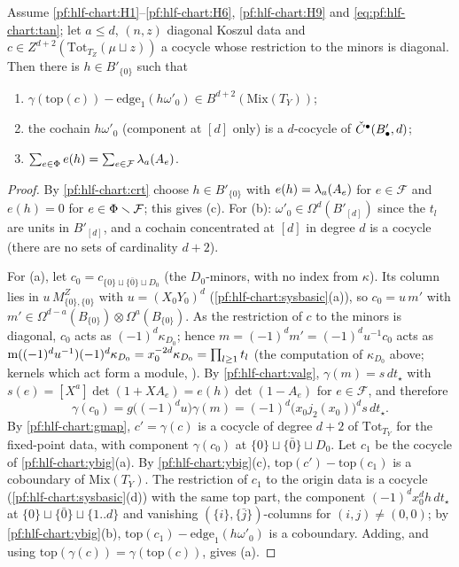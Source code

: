 \begin{lemma}[Localization]\label{pf:hlf-chart:ymain}
Assume \ref{pf:hlf-chart:H1}--\ref{pf:hlf-chart:H6}, \ref{pf:hlf-chart:H9} and \eqref{eq:pf:hlf-chart:tan}; let $a\le d$, $(n,z)$ diagonal Koszul data
and $c\in Z^{d+2}(\mathrm{Tot}_{T_Z}(\mu\sqcup z))$ a cocycle whose restriction to the minors is diagonal. Then there is $h\in B'_{\{0\}}$ such that
\begin{enumerate}[label=\textup{(\alph*)},nosep]
\item $\gamma(\mathrm{top}(c))-\mathrm{edge}_1(h\omega'_0)\in B^{d+2}(\mathrm{Mix}(T_Y))$;
\item the cochain $h\omega'_0$ (component at $[d]$ only) is a $d$-cocycle of $\check{C}^\bullet(B'_\bullet,d)$;
\item $\sum_{e\in\Phi}e(h)=\sum_{e\in\mathcal F}\lambda_a(A_e)$.
\end{enumerate}
\end{lemma}

\begin{proof}
By \cref{pf:hlf-chart:crt} choose $h\in B'_{\{0\}}$ with $e(h)=\lambda_a(A_e)$ for $e\in\mathcal F$ and $e(h)=0$ for $e\in\Phi\smallsetminus\mathcal F$;
this gives (c). For (b): $\omega'_0\in\Omega^d(B'_{[d]})$ since the $t_l$ are units in $B'_{[d]}$, and a cochain concentrated at $[d]$ in degree $d$ is
a cocycle (there are no sets of cardinality $d+2$).

For (a), let $c_0=c_{\{0\}\sqcup\{\bar 0\}\sqcup D_0}$ (the $D_0$-minors, with no index from $\kappa$). Its column lies in $u\,M^Z_{\{0\},\{0\}}$ with
$u=(X_0Y_0)^d$ (\cref{pf:hlf-chart:sysbasic}(a)), so $c_0=u\,m'$ with $m'\in\Omega^{d-a}(B_{\{0\}})\otimes\Omega^a(B_{\{0\}})$. As the restriction of $c$
to the minors is diagonal, $c_0$ acts as $(-1)^d\kappa_{D_0}$; hence $m=(-1)^dm'=(-1)^du^{-1}c_0$ acts as
$\operatorname{m}((-1)^du^{-1})(-1)^d\kappa_{D_0}=x_0^{-2d}\kappa_{D_0}=\prod_{l\ge1}t_l$ (the computation of $\kappa_{D_0}$ above; kernels which act form
a module, ). By \cref{pf:hlf-chart:valg}, $\gamma(m)=s\,dt_\star$ with
$s(e)=[X^a]\det(1+XA_e)=e(h)\det(1-A_e)$ for $e\in\mathcal F$, and therefore
\[
  \gamma(c_0)=g\bigl((-1)^du\bigr)\gamma(m)=(-1)^d\bigl(x_0j_2(x_0)\bigr)^d s\,dt_\star .
\]
By \cref{pf:hlf-chart:gmap}, $c'=\gamma(c)$ is a cocycle of degree $d+2$ of $\mathrm{Tot}_{T_Y}$ for the fixed-point data, with component $\gamma(c_0)$ at
$\{0\}\sqcup\{\bar0\}\sqcup D_0$. Let $c_1$ be the cocycle of \cref{pf:hlf-chart:ybig}(a). By \cref{pf:hlf-chart:ybig}(c),
$\mathrm{top}(c')-\mathrm{top}(c_1)$ is a coboundary of $\mathrm{Mix}(T_Y)$. The restriction of $c_1$ to the origin data is a cocycle
(\cref{pf:hlf-chart:sysbasic}(d)) with the same top part, the component $(-1)^dx_0^dh\,dt_\star$ at $\{0\}\sqcup\{\bar0\}\sqcup\{1..d\}$ and vanishing
$(\{i\},\{\bar j\})$-columns for $(i,j)\ne(0,0)$; by \cref{pf:hlf-chart:ybig}(b), $\mathrm{top}(c_1)-\mathrm{edge}_1(h\omega'_0)$ is a coboundary. Adding,
and using $\mathrm{top}(\gamma(c))=\gamma(\mathrm{top}(c))$, gives (a).
\end{proof}

